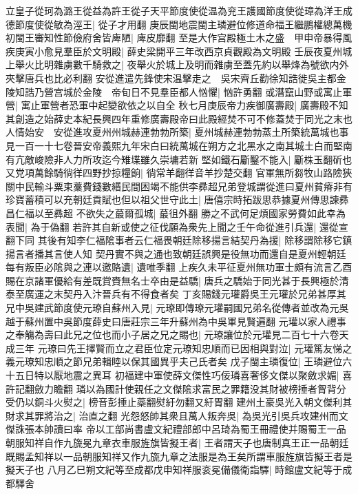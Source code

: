 立皇子從珂為潞王從益為許王從子天平節度使從温為兖王護國節度使從璋為洋王成德節度使從敏為涇王|{
	從子才用翻}
庚辰閩地震閩主璘避位修道命福王繼鵬權總萬機初閩王審知性節儉府舍皆庳陋|{
	庳皮靡翻}
至是大作宫殿極土木之盛　甲申帝暴得風疾庚寅小愈見羣臣於文明殿|{
	薛史梁開平三年改西京貞觀殿為文明殿}
壬辰夜夏州城上舉火比明雜虜數千騎救之|{
	夜舉火於城上及明而雜虜至蓋先約以舉烽為號欲内外夾擊唐兵也比必利翻}
安從進遣先鋒使宋温擊走之　吳宋齊丘勸徐知誥徙吳主都金陵知誥乃營宫城於金陵　帝旬日不見羣臣都人忷懼|{
	忷許勇翻}
或潛竄山野或寓止軍營|{
	寓止軍營者恐軍中起變欲依之以自全}
秋七月庚辰帝力疾御廣壽殿|{
	廣壽殿不知其創造之始薛史本紀長興四年重修廣壽殿帝曰此殿經焚不可不修蓋焚于同光之末也}
人情始安　安從進攻夏州州城赫連勃勃所築|{
	夏州城赫連勃勃蒸土所築統萬城也事見一百一十七卷晉安帝義熙九年宋白曰統萬城在朔方之北黑水之南其城土白而堅南有亢敵峻險非人力所攻迄今雉堞雖久崇墉若新}
堅如鐵石斸鑿不能入|{
	斸株玉翻斫也}
又党項萬餘騎徜徉四野抄掠糧餉|{
	徜常羊翻徉音羊抄楚交翻}
官軍無所芻牧山路險狹關中民輸斗粟束藳費錢數緡民間困竭不能供李彞超兄弟登城謂從進曰夏州貧瘠非有珍寶蓄積可以充朝廷貢賦也但以祖父世守此土|{
	唐僖宗時拓跋思恭據夏州傳思諫彞昌仁福以至彞超}
不欲失之蕞爾孤城|{
	蕞徂外翻}
勝之不武何足煩國家勞費如此幸為表聞|{
	為于偽翻}
若許其自新或使之征伐願為衆先上聞之壬午命從進引兵還|{
	還從宣翻下同}
其後有知李仁福隂事者云仁福畏朝廷除移揚言結契丹為援|{
	除移謂除移它鎮揚言者播其言使人知}
契丹實不與之通也致朝廷誤興是役無功而還自是夏州輕朝廷每有叛臣必隂與之連以邀賂遺|{
	遺唯季翻}
上疾久未平征夏州無功軍士頗有流言乙酉賜在京諸軍優給有差既賞賚無名士卒由是益驕|{
	唐兵之驕始于同光甚于長興極於清泰至廣運之末契丹入汴晉兵有不得食者矣}
丁亥賜錢元瓘爵吳王元瓘於兄弟甚厚其兄中吳建武節度使元璙自蘇州入見|{
	元璙即傳璙元瓘嗣國兄弟名從傳者並改為元吳越于蘇州置中吳節度薛史曰唐莊宗三年升蘇州為中吳軍見賢遍翻}
元瓘以家人禮事之奉觴為壽曰此兄之位也而小子居之兄之賜也|{
	元璙讓位於元瓘見二百七十六卷天成三年}
元璙曰先王擇賢而立之君臣位定元璙知忠順而已因相與對泣|{
	元瓘篤友悌之義元璙知忠順之節兄弟輯睦以保其國異乎夫己氏者矣}
戊子閩主璘復位|{
	王璘避位六十五日特以厭地震之異耳}
初福建中軍使薛文傑性巧佞璘喜奢侈文傑以聚斂求媚|{
	喜許記翻斂力瞻翻}
璘以為國計使親任之文傑隂求富民之罪籍没其財被榜捶者胷背分受仍以銅斗火熨之|{
	榜音彭捶止蘂翻熨紆勿翻又紆胃翻}
建州土豪吳光入朝文傑利其財求其罪將治之|{
	治直之翻}
光怨怒帥其衆且萬人叛奔吳|{
	為吳光引吳兵攻建州而文傑誅張本帥讀曰率}
帝以工部尚書盧文紀禮部郎中呂琦為蜀王冊禮使并賜蜀王一品朝服知祥自作九旒冕九章衣車服旌旗皆擬王者|{
	王者謂天子也唐制真王正一品朝廷既賜孟知祥以一品朝服知祥又作九旒九章之法服是為王矣所謂車服旌旗皆擬王者是擬天子也}
八月乙巳朔文紀等至成都戊申知祥服衮冕備儀衛詣驛|{
	時館盧文紀等于成都驛舍}
